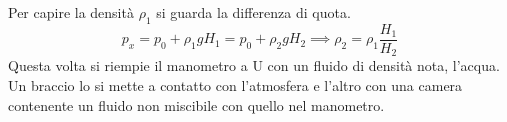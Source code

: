 \documentclass[10pt,a4paper]{book}
\begin{document}
\FloatBarrier
Per capire la densità $\rho_1$ si guarda la differenza di quota.
\[
	p_x = p_0 + \rho_1 g H_1 = p_0 + \rho_2 gH_2 \implies \boxed{\rho_2 = \rho_1\frac{H_1 }{H_2 }  }
\]
Questa volta si riempie il manometro a U con un fluido di densità nota, l'acqua. Un braccio lo si mette a contatto con l'atmosfera e l'altro con una camera contenente un fluido non miscibile con quello nel manometro.
\begin{figure}[htpb]
	\centering
	


	\begin{tikzpicture}[x=0.75pt,y=0.75pt,yscale=-1,xscale=1]


\end{tikzpicture}
\end{figure}
\end{document}
